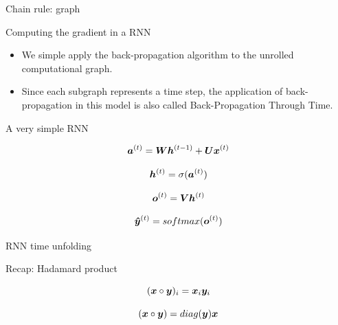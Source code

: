 \documentclass[10pt]{beamer}
\begin{document}
\begin{frame}{Chain rule: graph}

\end{frame}

\begin{frame}{Computing the gradient in a RNN}
\begin{itemize}
\item We simple apply the back-propagation algorithm to the unrolled computational graph.

\vspace{0.5cm}

\item Since each subgraph represents a time step, the application of back-propagation in this model is also called \alert{Back-Propagation Through Time}.
\end{itemize}
\end{frame}


\begin{frame}{A very simple RNN}

\Large{
\begin{equation*}
\bm{a}^{(t)} = \bm{W} \bm{h}^{(t-1)} + \bm{U} \bm{x}^{(t)}
\end{equation*}

\vspace{0.1cm}

\begin{equation*}
\bm{h}^{(t)} = \sigma(\bm{a}^{(t)})
\end{equation*}

\vspace{0.1cm}

\begin{equation*}
\bm{o}^{(t)} = \bm{V} \bm{h}^{(t)}
\end{equation*}

\vspace{0.1cm}

\begin{equation*}
\bm{\hat{y}}^{(t)} = softmax(\bm{o}^{(t)})
\end{equation*}
}

\end{frame}


\begin{frame}{RNN time unfolding}

\end{frame}

\begin{frame}{Recap: Hadamard product}
\Large{
\begin{equation*}
(\bm{x} \circ \bm{y})_{i} = \bm{x}_{i} \bm{y}_{i} 
\end{equation*}

\vspace{0.5cm}

\begin{equation*}
(\bm{x} \circ \bm{y}) = diag(\bm{y})\bm{x} 
\end{equation*}
 }
\end{frame}
\end{document}
